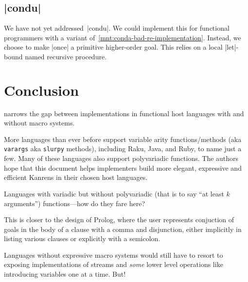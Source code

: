 \documentclass[sigplan,screen,draft,anonymous,review,natbib=false]{acmart}
\begin{document}
\subsection{\rackinline|condu|}

We have not yet addressed~\rackinline|condu|. We could implement this
for functional programmers with a variant
of~\cref{mnt:conda-bad-re-implementation}. Instead, we choose to make
\rackinline|once| a primitive higher-order goal. This relies on a
local \rackinline|let|-bound named recursive procedure.


\section{Conclusion}\label{sec:conclusion}

narrows the gap between implementations in functional host languages
with and without macro systems.

More languages than ever before support variable arity
functions/methods (aka \verb|varargs| aka \verb|slurpy| methods),
including Raku, Java, and Ruby, to name just a few. Many of these
languages also support polyvariadic functions. The authors hope that
this document helps implementers build more elegant, expressive and
efficient Kanrens in their chosen host languages.

Languages with variadic but without polyvariadic (that is to say
\enquote{at least $k$ arguments}) functions---how do they fare here?

This is closer to the design of Prolog,
where the user represents conjuction of goals in the body of a clause
with a comma and disjunction, either implicitly in listing various
clauses or explicitly with a semicolon.

Languages without expressive macro systems would still have to resort
to exposing implementations of streams and \emph{some} lower level
operations like introducing variables one at a time. But!
\end{document}
